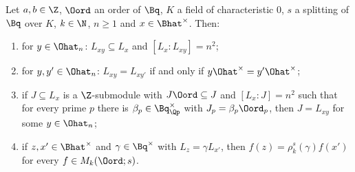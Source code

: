 Let $a,b\in\Z$, $\Oord$ an order of $\Bq$, $K$ a field of characteristic $0$, $s$ a splitting of $\Bq$ over $K$, $k\in\N$, $n\ge1$ and
$x\in\Bhat^\times$. Then:
\begin{enumerate}[label=(\alph*)]
\item for $y\in\Ohat_n$: $L_{xy}\subseteq L_x$ and $[L_x:L_{xy}]=n^2$;
\item for $y,y'\in\Ohat_n$: $L_{xy}=L_{xy'}$ if and only if $y\Ohat^\times=y'\Ohat^\times$;
\item if $J\subseteq L_x$ is a $\Z$-submodule with $J\Oord\subseteq J$ and $[L_x:J]=n^2$ such that for every prime $p$ there is
  $\beta_p\in\Bq_{\Qp}^\times$ with $J_p=\beta_p\Oord_p$, then $J=L_{xy}$ for some $y\in\Ohat_n$;
\item if $z,x'\in\Bhat^\times$ and $\gamma\in\Bq^\times$ with $L_z=\gamma L_{x'}$, then $f(z)=\rho_k^s(\gamma)f(x')$ for every $f\in M_k(\Oord;s)$.
\end{enumerate}
